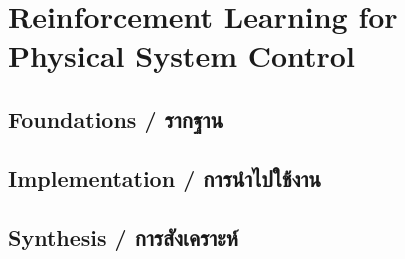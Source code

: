 \chapter{Reinforcement Learning for Physical System Control}
\label{ch:reinforcement_learning}

\section{Foundations \quad / \quad \textthai{รากฐาน}}



\section{Implementation \quad / \quad \textthai{การนำไปใช้งาน}}



\section{Synthesis \quad / \quad \textthai{การสังเคราะห์}}



